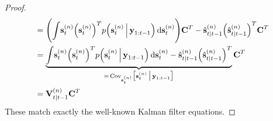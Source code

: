\begin{proof}
\begin{align*}
					&= \Bigg(\! \int\! \boldsymbol{\mathrm{s}}_t^{(n)} \Big(\boldsymbol{\mathrm{s}}_t^{(n)}\Big)^T p\Big(\boldsymbol{\mathrm{s}}_t^{(n)} \,\Big\vert\, \boldsymbol{\mathrm{y}}_{1:t - 1}\Big) \dd{\boldsymbol{\mathrm{s}}_t^{(n)}} \!\Bigg) \boldsymbol{\mathrm{C}}^T - \hat{\boldsymbol{\mathrm{s}}}_{t \vert t - 1}^{(n)} \Big(\hat{\boldsymbol{\mathrm{s}}}_{t \vert t - 1}^{(n)}\Big)^T \boldsymbol{\mathrm{C}}^T \\
					&= \underbrace{\int\! \boldsymbol{\mathrm{s}}_t^{(n)} \Big(\boldsymbol{\mathrm{s}}_t^{(n)}\Big)^T p\Big(\boldsymbol{\mathrm{s}}_t^{(n)} \,\Big\vert\, \boldsymbol{\mathrm{y}}_{1:t - 1}\Big) \dd{\boldsymbol{\mathrm{s}}_t^{(n)}} - \hat{\boldsymbol{\mathrm{s}}}_{t \vert t - 1}^{(n)} \Big(\hat{\boldsymbol{\mathrm{s}}}_{t \vert t - 1}^{(n)}\Big)^T}_{=\, \operatorname{Cov}_{\boldsymbol{\mathrm{s}}_t^{(n)}}\!\big[\boldsymbol{\mathrm{s}}_t^{(n)} \,\big\vert\, \boldsymbol{\mathrm{y}}_{1:t - 1}\big]} \boldsymbol{\mathrm{C}}^T \\
					&= \boldsymbol{\mathrm{V}}_{t \vert t - 1}^{(n)} \boldsymbol{\mathrm{C}}^T
			\end{align*}
			These match exactly the well-known Kalman filter equations.


\end{proof}
